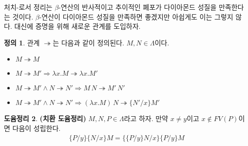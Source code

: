 \documentclass[b5paper, 10pt]{book}
\theoremstyle{definition}
\newtheorem{defn}{정의}[chapter]
\newtheorem{lem}[defn]{도윰정리}
\begin{document}
처치-로서 정리는 $\beta$-연산의 반사적이고 추이적인 폐포가 다이아몬드 성질을 만족한다는 것이다.
$\beta$-연산이 다이아몬드 성질을 만족하면 좋겠지만 아쉽게도 이는 그렇지 않다. 대신에 
증명을 위해 새로운 관계를 도입하자.
\begin{defn}
    관계 $\twoheadrightarrow$는 다음과 같이 정의된다. $M,N \in \Lambda$이다.
    \begin{itemize}
        \item $M \twoheadrightarrow M $
        \item $M \twoheadrightarrow M' \Rightarrow 
        \lambda x. M \twoheadrightarrow \lambda x. M'$
        \item $M \twoheadrightarrow M' \wedge N \twoheadrightarrow N' \Rightarrow
        M \, N \twoheadrightarrow M' \, N' $
        \item $M \twoheadrightarrow M' \wedge N \twoheadrightarrow N' \Rightarrow
        (\lambda x. M)\, N \twoheadrightarrow \{N'/x\}M'$
    \end{itemize}
\end{defn}
\begin{lem}
    \textbf{(치환 도윰정리)} $M, N, P \in \Lambda$라고 하자. 만약 $x \neq y$이고 $x \notin
    FV(P)$이면 다음이 성립한다.
    \begin{align*}
        \{P / y\} \{ N / x\} M = \{ \{P / y\} N / x \} \{P / y\}  M
    \end{align*}
\end{lem}
\end{document}

